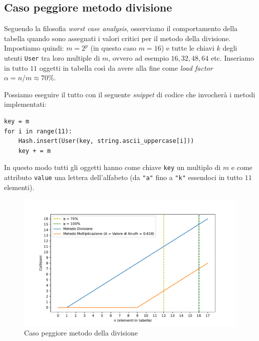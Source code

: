 \subsection{Caso peggiore metodo divisione} \label{caso_peggiore_div}
Seguendo la filosofia \textit{worst case analysis}, osserviamo il comportamento della tabella quando sono assegnati i valori critici per il metodo della divisione. \\
Impostiamo quindi: $m = 2^{p}$ (in questo caso $m = 16$) e tutte le chiavi $k$ degli utenti \verb|User| tra loro multiple di $m$, ovvero ad esempio $16,32,48,64$ etc.
Inseriamo in tutto $11$ oggetti in tabella così da avere alla fine come \textit{load factor} $\alpha = n/m \approx 70\%$.

Possiamo eseguire il tutto con il seguente \textit{snippet} di codice che invocherà i metodi implementati:

\lstset{
      basicstyle=\small,
      xleftmargin=.1\textwidth,
}
\begin{lstlisting}
key = m
for i in range(11):
    Hash.insert(User(key, string.ascii_uppercase[i]))
    key + = m
\end{lstlisting}


In questo modo tutti gli oggetti hanno come chiave \verb|key| un multiplo di $m$ e come attributo \verb|value| una lettera dell'alfabeto (da \verb|"a"| fino a \verb|"k"| essendoci in tutto $11$ elementi).

\begin{figure}[htb]
    \begin{center}
    \includegraphics[scale=0.57]{src/img/worstcase.pdf}
    \caption{Caso peggiore metodo della divisione}
     \label{fig:met_div}
    \end{center}
\end{figure}

